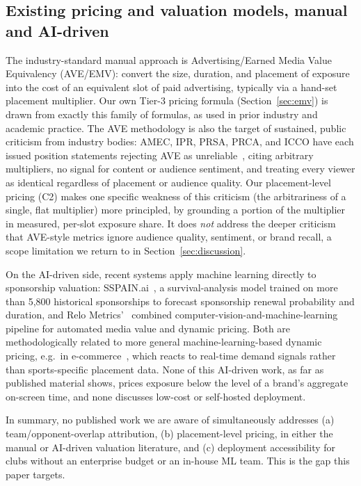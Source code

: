 \documentclass[conference,a4paper]{IEEEtran}
\begin{document}
\subsection{Existing pricing and valuation models, manual and AI-driven}
\label{sec:related-pricing}
The industry-standard manual approach is Advertising/Earned Media Value Equivalency
(AVE/EMV): convert the size, duration, and placement of exposure into the cost of an
equivalent slot of paid advertising, typically via a hand-set placement multiplier. Our
own Tier-3 pricing formula (Section~\ref{sec:emv}) is drawn from exactly this family of
formulas, as used in prior industry and academic practice. The AVE methodology is also the target of
sustained, public criticism from industry bodies: AMEC, IPR, PRSA, PRCA, and ICCO have
each issued position statements rejecting AVE as unreliable~\cite{ave_criticism},
citing arbitrary multipliers, no signal for content or audience sentiment, and treating
every viewer as identical regardless of placement or audience quality. Our
placement-level pricing (C2) makes one specific weakness of this criticism (the
arbitrariness of a single, flat multiplier) more principled, by grounding a portion of
the multiplier in measured, per-slot exposure share. It does \emph{not} address the
deeper criticism that AVE-style metrics ignore audience quality, sentiment, or brand
recall, a scope limitation we return to in Section~\ref{sec:discussion}.

On the AI-driven side, recent systems apply machine learning directly to sponsorship
valuation: SSPAIN.ai~\cite{sspain_ai}, a survival-analysis model trained on more than
5{,}800 historical sponsorships to forecast sponsorship renewal probability and
duration, and Relo Metrics'~\cite{relometrics_ai} combined
computer-vision-and-machine-learning pipeline for automated media value and dynamic
pricing. Both are methodologically related to more general machine-learning-based
dynamic pricing, e.g.\ in e-commerce~\cite{dynamic_pricing_ml_ecommerce}, which reacts
to real-time demand signals rather than sports-specific placement data. None of this
AI-driven work, as far as published material shows, prices exposure below the level of
a brand's aggregate on-screen time, and none discusses low-cost or self-hosted
deployment.

\smallskip\noindent
In summary, no published work we are aware of simultaneously addresses (a)
team/opponent-overlap attribution, (b) placement-level pricing, in either the manual or
AI-driven valuation literature, and (c) deployment accessibility for clubs without an
enterprise budget or an in-house ML team. This is the gap this paper targets.
\end{document}
